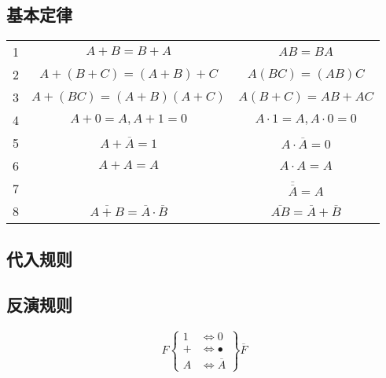 \newpage

\subsection{基本定律}

\begin{table}[!htbp]
    \centering
    \begin{tabular}{c|c|c}
        \toprule
        1 & $A+B=B+A$                                      & $AB=BA$                                 \\
        2 & $A+(B+C)=(A+B)+C$                              & $A(BC)=(AB)C$                           \\
        3 & $A+(BC)=(A+B)(A+C)$                            & $A(B+C)=AB+AC$                          \\
        4 & $A+0=A , A+1=0$                                & $A \cdot 1=A , A \cdot 0=0$             \\
        5 & $A+\overline A =1$                             & $A \cdot \overline A  =0$               \\
        6 & $A+A=A$                                        & $A \cdot A=A$                           \\
        7 &                                                & $\overline{\overline A}=A$              \\
        8 & $\overline{A+B}=\overline A \cdot \overline B$ & $\overline{AB}=\overline A+\overline B$ \\
        \bottomrule
    \end{tabular}
\end{table}

\newpage

\subsection{代入规则}

\subsection{反演规则}

\begin{equation}
    F\left\{
    \begin{aligned}
        1 & \Longleftrightarrow 0           \\
        + & \Longleftrightarrow \bullet     \\
        A & \Longleftrightarrow \overline A
    \end{aligned}
    \right\}\overline F
\end{equation}

